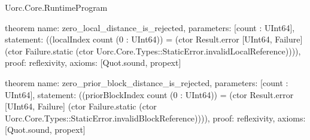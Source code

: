 \begin{lexlean}{Uorc.Core.RuntimeProgram}
\begin{semanticmodule}
theorem{
  name: zero_local_distance_is_rejected,
  parameters: [count : UInt64],
  statement: ((localIndex count (0 : UInt64)) = (ctor Result.error [UInt64, Failure] (ctor Failure.static (ctor Uorc.Core.Types::StaticError.invalidLocalReference)))),
  proof: reflexivity{},
  axioms: [Quot.sound, propext]
}

theorem{
  name: zero_prior_block_distance_is_rejected,
  parameters: [count : UInt64],
  statement: ((priorBlockIndex count (0 : UInt64)) = (ctor Result.error [UInt64, Failure] (ctor Failure.static (ctor Uorc.Core.Types::StaticError.invalidBlockReference)))),
  proof: reflexivity{},
  axioms: [Quot.sound, propext]
}
\end{semanticmodule}
\end{lexlean}
